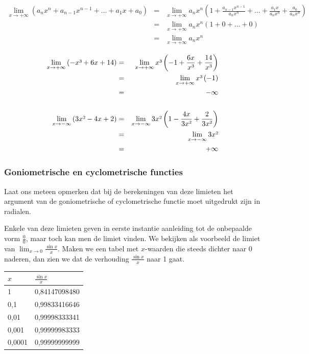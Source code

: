 \begin{eqnarray*}
\lim_{x\to+\infty}\left(a_{n}x^{n}+a_{n-1}x^{n-1}+\ldots+a_{1}x+a_{0}\right)&=& \lim_{x\to+\infty}a_{n}x^{n}\left(1+\frac{a_{n-1}x^{n-1}}{a_{n}x^{n}}+\ldots+\frac{a_{1}x}{a_{n}x^{n}}+\frac{a_{0}}{a_{n}x^{n}}\right) \\
&=& \lim_{x\to+\infty}a_{n}x^{n}(1+0+\ldots+0)\\
&=& \lim_{x\to+\infty}a_{n}x^{n}
\end{eqnarray*}


\begin{voorbeeld}
\begin{eqnarray*}
\lim_{x\to+\infty}\left(-x\text{\textthreesuperior}+6x+14\right)&=& \lim_{x\to+\infty}x\text{\textthreesuperior}\left(-1+\frac{6x}{x\text{\textthreesuperior}}+\frac{14}{x\text{\textthreesuperior}}\right)\\
&=& \lim_{x\to+\infty}x\text{\textthreesuperior}\left(-1\right)\\
&=&-\infty\\
& & \\
\lim_{x\to-\infty}\left(3x\text{\texttwosuperior}-4x+2\right)&=& \lim_{x\to-\infty}3x\text{\texttwosuperior}\left(1-\frac{4x}{3x\text{\texttwosuperior}}+\frac{2}{3x\text{\texttwosuperior}}\right)\\
&=&\lim_{x\to-\infty}3x\text{\texttwosuperior}\\
&=&+\infty
\end{eqnarray*}
\end{voorbeeld}

\subsubsection{Goniometrische en cyclometrische functies}

Laat ons meteen opmerken dat bij de berekeningen van deze limieten
het argument van de goniometrische of cyclometrische functie moet
uitgedrukt zijn in radialen. 

Enkele van deze limieten geven in eerste instantie aanleiding
tot de onbepaalde vorm $\frac{0}{0}$, maar toch kan men de limiet
vinden. We bekijken als voorbeeld de limiet van $ \lim_{x\to0}\frac{\sin x}{x}$.
Maken we een tabel met $x$-waarden die steeds dichter naar $0$ naderen,
dan zien we dat de verhouding $\frac{\sin x}{x}$ naar 1 gaat.

\begin{tabel*}{}
	\centering
	\begin{tabular}{l|l}
		$x$ & $\frac{\sin x}{x}$\\
		\hline 
		1 & 0,84147098480\\
		0,1 & 0,99833416646\\
		0,01 & 0,99998333341\\
		0,001 & 0,99999983333\\
		0,0001 & 0,99999999999\\
	\end{tabular}
\end{tabel*}



